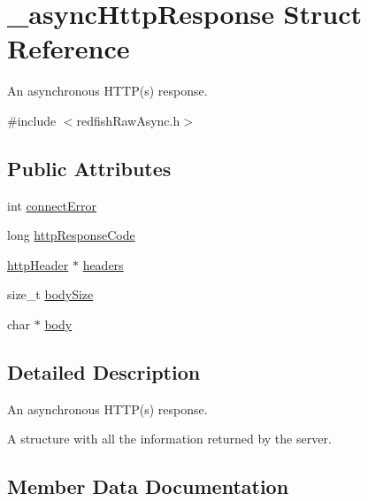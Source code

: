\hypertarget{struct__asyncHttpResponse}{}\section{\+\_\+async\+Http\+Response Struct Reference}
\label{struct__asyncHttpResponse}


An asynchronous H\+T\+T\+P(s) response.  




{\ttfamily \#include $<$redfish\+Raw\+Async.\+h$>$}

\subsection*{Public Attributes}
\begin{DoxyCompactItemize}
\item 
int \hyperlink{struct__asyncHttpResponse_a0f9394289504da22db846788a19ccf66}{connect\+Error}
\item 
long \hyperlink{struct__asyncHttpResponse_a97fac4e7095590d7cc4e8ccb2dfd753b}{http\+Response\+Code}
\item 
\hyperlink{redfishRawAsync_8h_a3ee36950587f4749a62b080e3e157280}{http\+Header} $\ast$ \hyperlink{struct__asyncHttpResponse_a1de52b16a28ada8e4b25f22a09a37212}{headers}
\item 
size\+\_\+t \hyperlink{struct__asyncHttpResponse_a25cf7e4fe3454983f74d12cb12c92960}{body\+Size}
\item 
char $\ast$ \hyperlink{struct__asyncHttpResponse_aecf03a88cefe1e39c1ac8b164c254aec}{body}
\end{DoxyCompactItemize}


\subsection{Detailed Description}
An asynchronous H\+T\+T\+P(s) response. 

A structure with all the information returned by the server. 

\subsection{Member Data Documentation}
\mbox{\label{struct__asyncHttpResponse_aecf03a88cefe1e39c1ac8b164c254aec}} 
